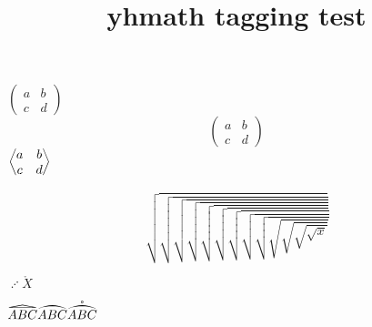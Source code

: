 \documentclass{article}
\title{yhmath tagging test}
\begin{document}
$\begin{pmatrix} a & b\\ c & d\end{pmatrix}$
\[\begin{pmatrix} a & b\\ c & d\end{pmatrix}\]
$\begin{amatrix} a & b\\ c & d\end{amatrix}$

\[\sqrt{\sqrt{\sqrt{\sqrt{\sqrt{\sqrt{\sqrt{\sqrt{\sqrt{\sqrt{\sqrt{\sqrt{\sqrt x}}}}}}}}}}}}\]

$\adots\ring{X}$

$\widetriangle{ABC}\wideparen{ABC}\widering{ABC}$
\end{document}
